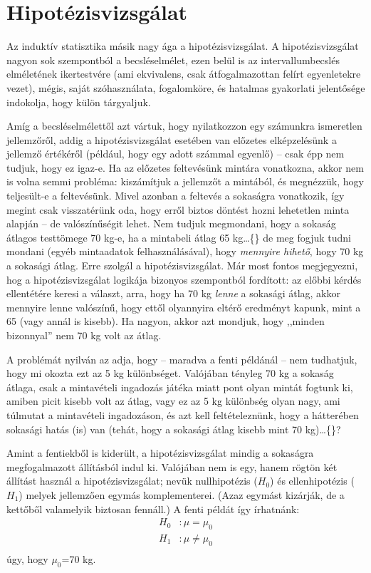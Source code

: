 \documentclass[]{book}
\begin{document}
\hypertarget{induktivhipotezisvizsgalat}{%
\section{Hipotézisvizsgálat}\label{induktivhipotezisvizsgalat}}

Az induktív statisztika másik nagy ága a hipotézisvizsgálat. A hipotézisvizsgálat nagyon sok szempontból a becsléselmélet, ezen belül is az intervallumbecslés elméletének ikertestvére (ami ekvivalens, csak átfogalmazottan felírt egyenletekre vezet), mégis, saját szóhasználata, fogalomköre, és hatalmas gyakorlati jelentősége indokolja, hogy külön tárgyaljuk.

Amíg a becsléselmélettől azt vártuk, hogy nyilatkozzon egy számunkra ismeretlen jellemzőről, addig a hipotézisvizsgálat esetében van előzetes elképzelésünk a jellemző értékéről (például, hogy egy adott számmal egyenlő) -- csak épp nem tudjuk, hogy ez igaz-e. Ha az előzetes feltevésünk mintára vonatkozna, akkor nem is volna semmi probléma: kiszámítjuk a jellemzőt a mintából, és megnézzük, hogy teljesült-e a feltevésünk. Mivel azonban a feltevés a sokaságra vonatkozik, így megint csak visszatérünk oda, hogy erről biztos döntést hozni lehetetlen minta alapján -- de valószínűségit lehet. Nem tudjuk megmondani, hogy a sokaság átlagos testtömege 70 kg-e, ha a mintabeli átlag 65 kg\dots\{\} de meg fogjuk tudni mondani (egyéb mintaadatok felhasználásával), hogy \emph{mennyire hihető}, hogy 70 kg a sokasági átlag. Erre szolgál a hipotézisvizsgálat. Már most fontos megjegyezni, hog a hipotézisvizsgálat logikája bizonyos szempontból fordított: az előbbi kérdés ellentétére keresi a választ, arra, hogy ha 70 kg \emph{lenne} a sokasági átlag, akkor mennyire lenne valószínű, hogy ettől olyannyira eltérő eredményt kapunk, mint a 65 (vagy annál is kisebb). Ha nagyon, akkor azt mondjuk, hogy ,,minden bizonnyal'' nem 70 kg volt az átlag.

A problémát nyilván az adja, hogy -- maradva a fenti példánál -- nem tudhatjuk, hogy mi okozta ezt az 5 kg különbséget. Valójában tényleg 70 kg a sokaság átlaga, csak a mintavételi ingadozás játéka miatt pont olyan mintát fogtunk ki, amiben picit kisebb volt az átlag, vagy ez az 5 kg különbség olyan nagy, ami túlmutat a mintavételi ingadozáson, és azt kell feltételeznünk, hogy a hátterében sokasági hatás (is) van (tehát, hogy a sokasági átlag kisebb mint 70 kg)\dots\{\}?

Amint a fentiekből is kiderült, a hipotézisvizsgálat mindig a sokaságra megfogalmazott állításból indul ki. Valójában nem is egy, hanem rögtön két állítást használ a hipotézisvizsgálat; nevük nullhipotézis (\(H_0\)) és ellenhipotézis (\(H_1\)) melyek jellemzően egymás komplementerei. (Azaz egymást kizárják, de a kettőből valamelyik biztosan fennáll.) A fenti példát így írhatnánk:
\begin{align*}
    H_0&: \mu = \mu_0\\
    H_1&: \mu \neq \mu_0\\
\end{align*}
úgy, hogy \(\mu_0\)=70 kg.
\end{document}
